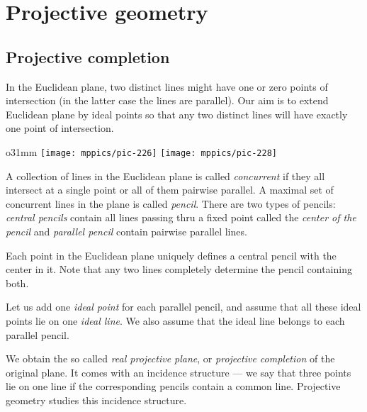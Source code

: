 \chapter{Projective geometry}\label{chap:proj}

\section*{Projective completion}

In the Euclidean plane, two distinct lines might have one or zero points of intersection 
(in the latter case the lines are parallel).
Our aim is to extend Euclidean plane by ideal points so that any two distinct lines will have exactly one point of intersection.

\begin{wrapfigure}{o}{31mm}
\centering
\texttt{[image: mppics/pic-226]}
\vskip4mm
\texttt{[image: mppics/pic-228]}
\end{wrapfigure}

A collection of lines in the Euclidean plane is called \emph{concurrent} if they all intersect at a single point or all of them pairwise parallel.
A maximal set of concurrent lines in the plane is called \emph{pencil}.
There are two types of pencils: 
\emph{central pencils} contain all lines passing thru a fixed point called the \emph{center of the pencil}
and  
\emph{parallel pencil} contain pairwise parallel lines.

Each point in the Euclidean plane uniquely defines a central pencil with the center in it.
Note that any two lines completely determine the pencil containing both.

Let us add one \emph{ideal point} for each parallel pencil,
and assume that all these ideal points lie on one \emph{ideal line}.
We also assume that the ideal line belongs to each parallel pencil.

We obtain the so called \emph{real projective plane}, or \emph{projective completion} of the original plane. 
It comes with an incidence structure --- we say that three points lie on one line if the corresponding pencils contain a common line.
Projective geometry studies this incidence structure.


